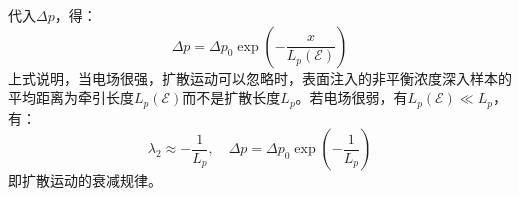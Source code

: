 代入$\Delta p$，得：
\begin{equation}
    \Delta p=\Delta p_0\exp{\left(-\frac{x}{L_p(\mathscr{E})}\right)}
\end{equation}
上式说明，当电场很强，扩散运动可以忽略时，表面注入的非平衡浓度深入样本的平均距离为牵引长度$L_p(\mathscr{E})$而不是扩散长度$L_p$。若电场很弱，有$L_p(\mathscr{E})\ll L_p$，有：
\begin{equation}
    \lambda_2\approx-\frac{1}{L_p},\quad \Delta p=\Delta p_0\exp{\left(-\frac{1}{L_p}\right)}
\end{equation}
即扩散运动的衰减规律。







